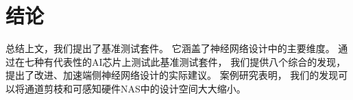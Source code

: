 \section{结论}
总结上文，我们提出了基准测试套件\sysname。
它涵盖了神经网络设计中的主要维度。
通过在七种有代表性的AI芯片上测试此基准测试套件，
我们提供八个综合的发现，
提出了改进、加速端侧神经网络设计的实际建议。
案例研究表明，
我们的发现可以将通道剪枝和可感知硬件NAS中的设计空间大大缩小。